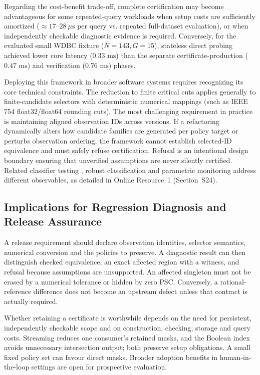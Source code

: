 \documentclass[11pt,a4paper]{article}
\begin{document}
Regarding the cost-benefit trade-off, complete certification may become advantageous for some repeated-query workloads when setup costs are sufficiently amortized ($\approx 17\text{--}28\ \mu\text{s}$ per query vs. repeated full-dataset evaluation), or when independently checkable diagnostic evidence is required. Conversely, for the evaluated small WDBC fixture ($N = 143, G = 15$), stateless direct probing achieved lower core latency ($0.33\text{ ms}$) than the separate certificate-production ($0.47\text{ ms}$) and verification ($0.76\text{ ms}$) phases.

Deploying this framework in broader software systems requires recognizing its core technical constraints. The reduction to finite critical cuts applies generally to finite-candidate selectors with deterministic numerical mappings (such as IEEE 754 float32/float64 rounding cuts). The most challenging requirement in practice is maintaining aligned observation IDs across versions. If a refactoring dynamically alters how candidate families are generated per policy target or perturbs observation ordering, the framework cannot establish selected-ID equivalence and must safely refuse certification. Refusal is an intentional design boundary ensuring that unverified assumptions are never silently certified. Related classifier testing \cite{duquetorres2025assessing,yang2021towards,xie2011testing}, robust classification \cite{provost2001robust} and parametric monitoring \cite{chen2009parametric} address different observables, as detailed in Online Resource~1 (Section~S24).


\subsection{Implications for Regression Diagnosis and Release Assurance}

A release requirement should declare observation identities, selector semantics, numerical conversion and the policies to preserve. A diagnostic result can then distinguish checked equivalence, an exact affected region with a witness, and refusal because assumptions are unsupported. An affected singleton must not be erased by a numerical tolerance or hidden by zero PSC. Conversely, a rational-reference difference does not become an upstream defect unless that contract is actually required.

Whether retaining a certificate is worthwhile depends on the need for persistent, independently checkable scope and on construction, checking, storage and query costs. Streaming reduces one consumer's retained masks, and the Boolean index avoids unnecessary intersection output; both preserve setup obligations. A small fixed policy set can favour direct masks. Broader adoption benefits in human-in-the-loop settings are open for prospective evaluation.
\end{document}
